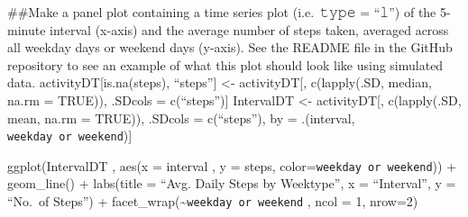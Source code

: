 \documentclass[
]{article}
\begin{document}
\#\#Make a panel plot containing a time series plot (i.e.~𝚝𝚢𝚙𝚎 = ``𝚕'')
of the 5-minute interval (x-axis) and the average number of steps taken,
averaged across all weekday days or weekend days (y-axis). See the
README file in the GitHub repository to see an example of what this plot
should look like using simulated data. activityDT{[}is.na(steps),
``steps''{]} \textless- activityDT{[}, c(lapply(.SD, median, na.rm =
TRUE)), .SDcols = c(``steps''){]} IntervalDT \textless- activityDT{[},
c(lapply(.SD, mean, na.rm = TRUE)), .SDcols = c(``steps''), by =
.(interval, \texttt{weekday\ or\ weekend}){]}

ggplot(IntervalDT , aes(x = interval , y = steps,
color=\texttt{weekday\ or\ weekend})) + geom\_line() + labs(title =
``Avg. Daily Steps by Weektype'', x = ``Interval'', y = ``No.~of
Steps'') + facet\_wrap(\textasciitilde{}\texttt{weekday\ or\ weekend} ,
ncol = 1, nrow=2)
\end{document}
